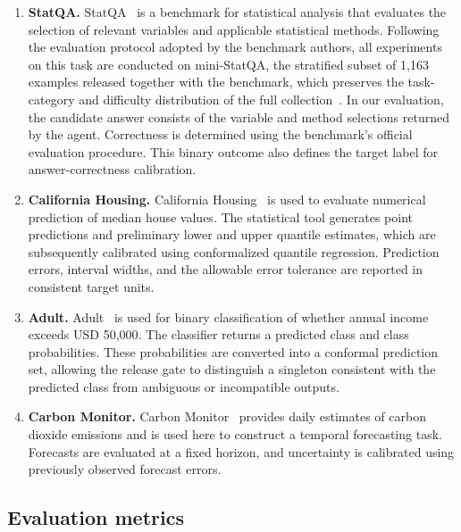 \documentclass[preprint,12pt,authoryear]{elsarticle}
\begin{document}
\begin{enumerate}
    \renewcommand{\labelenumi}{\arabic{enumi}.}
    \setlength{\itemsep}{6pt}

    \item \textbf{StatQA.}
    StatQA~\citep{zhu2024large} is a benchmark for statistical analysis that evaluates the selection of relevant variables and applicable statistical methods. Following the evaluation protocol adopted by the benchmark authors, all experiments on this task are conducted on mini-StatQA, the stratified subset of 1{,}163 examples released together with the benchmark, which preserves the task-category and difficulty distribution of the full collection~\citep{zhu2024large}. In our evaluation, the candidate answer consists of the variable and method selections returned by the agent. Correctness is determined using the benchmark's official evaluation procedure. This binary outcome also defines the target label for answer-correctness calibration.

    \item \textbf{California Housing.}
    California Housing~\citep{pace1997sparse} is used to evaluate numerical prediction of median house values. The statistical tool generates point predictions and preliminary lower and upper quantile estimates, which are subsequently calibrated using conformalized quantile regression. Prediction errors, interval widths, and the allowable error tolerance are reported in consistent target units.

    \item \textbf{Adult.}
    Adult~\citep{becker1996adult} is used for binary classification of whether annual income exceeds USD 50,000. The classifier returns a predicted class and class probabilities. These probabilities are converted into a conformal prediction set, allowing the release gate to distinguish a singleton consistent with the predicted class from ambiguous or incompatible outputs.

    \item \textbf{Carbon Monitor.}
    Carbon Monitor~\citep{liu2020carbon} provides daily estimates of carbon dioxide emissions and is used here to construct a temporal forecasting task. Forecasts are evaluated at a fixed horizon, and uncertainty is calibrated using previously observed forecast errors.

\end{enumerate}

\subsection{Evaluation metrics}
\label{sec:evaluation_metrics}
\end{document}
